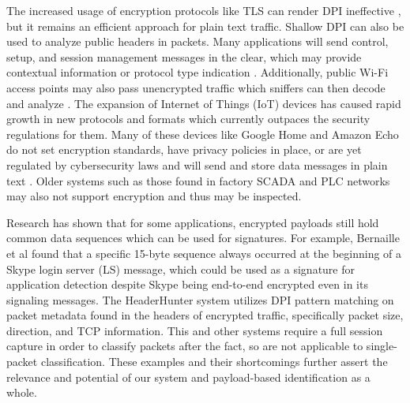 The increased usage of encryption protocols like TLS can render DPI ineffective \cite{ZHAO202122}, but it remains an efficient approach for plain text traffic. Shallow DPI can also be used to analyze public headers in packets. Many applications will send control, setup, and session management messages in the clear, which may provide contextual information or protocol type indication \cite{Hasanzadeh, Ogudo, Zhang}. Additionally, public Wi-Fi access points may also pass unencrypted traffic which sniffers can then decode and analyze \cite{Maimon}. The expansion of Internet of Things (IoT) devices has caused rapid growth in new protocols and formats which currently outpaces the security regulations for them. Many of these devices like Google Home and Amazon Echo do not set encryption standards, have privacy policies in place, or are yet regulated by cybersecurity laws and will send and store data messages in plain text \cite{wood2017cleartext, Capellupo, WangYong}. Older systems such as those found in factory SCADA and PLC networks may also not support encryption \cite{Malaka} and thus may be inspected.

Research has shown that for some applications, encrypted payloads still hold common data sequences which can be used for signatures. For example, Bernaille et al \cite{Bernaille} found that a specific 15-byte sequence always occurred at the beginning of a Skype login server (LS) message, which could be used as a signature for application detection despite Skype being end-to-end encrypted even in its signaling messages. The HeaderHunter system \cite{HeaderHunter} utilizes DPI pattern matching on packet metadata found in the headers of encrypted traffic, specifically packet size, direction, and TCP information. This and other systems \cite{Moore2013DiscriminatorsFU, Roughan} require a full session capture in order to classify packets after the fact, so are not applicable to single-packet classification. These examples and their shortcomings further assert the relevance and potential of our system and payload-based identification as a whole. \par


